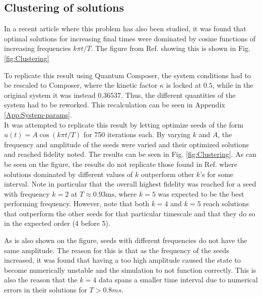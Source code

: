 \documentclass[a4paper, twocolumn]{revtex4-1}
\begin{document}
\subsection{\label{subsec:clustering}Clustering of solutions}

In a recent article \cite{QM2Paper} where this problem has also been studied, it was found that optimal solutions for increasing final times were dominated by cosine functions of increasing frequencies $k\pi t/T$. The figure from Ref.  \cite{QM2Paper} showing this is shown in Fig. \ref{fig:Clustering}

To replicate this result using Quantum Composer, the system conditions had to be rescaled to Composer, where the kinetic factor $\kappa$ is locked at $0.5$, while in the original system it was instead $0.36537$. Thus, the different quantities of the system had to be reworked. This recalculation can be seen in Appendix \ref{App:System-params}. \\

It was attempted to replicate this result by letting  optimize seeds of the form $u(t) = A\cos(k\pi t/T)$ for 750 iterations each. By varying $k$ and $A$, the frequency and amplitude of the seeds were varied and their optimized solutions and reached fidelity noted. The results can be seen in Fig. \ref{fig:Clustering}. As can be seen on the figure, the results do not replicate those found in Ref. \cite{QM2Paper} where solutions dominated by different values of $k$ outperform other $k$'s for some interval. Note in particular that the overall highest fidelity was reached for a seed with frequency $k=2$ at $ T\approx 0.93 \text{ms} $, where $ k=5 $ was expected to be the best performing frequency. However, note that both $k=4$ and $k=5$ reach solutions that outperform the other seeds for that particular timescale and that they do so in the expected order (4 before 5). 

As is also shown on the figure, seeds with different frequencies do not have the same amplitude. The reason for this is that as the frequency of the seeds increased, it was found that having a too high amplitude caused the state to become numerically unstable and the simulation to not function correctly. This is also the reason that the $k=4$ data spans a smaller time interval due to numerical errors in their solutions for $T>0.8 ms$. \\
\end{document}

